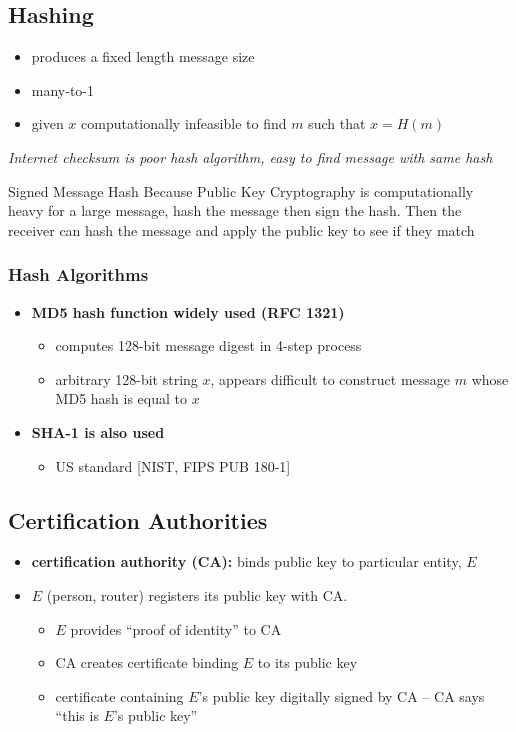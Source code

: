 \subsection{Hashing}
\begin{itemize}
	\item produces a fixed length message size
	\item many-to-1
	\item given $x$ computationally infeasible to find $m$ such that $x=H(m)$
\end{itemize}
\textit{Internet checksum is poor hash algorithm, easy to find message with same hash}
\begin{note}{Signed Message Hash}
	Because Public Key Cryptography is computationally heavy for a large message, hash the message then sign the hash. Then the receiver can hash the message and apply the public key to see if they match
\end{note}
\subsubsection{Hash Algorithms}
\begin{itemize}
	\item \textbf{MD5 hash function widely used (RFC 1321)}
	\begin{itemize}
		\item computes 128-bit message digest in 4-step process
		\item arbitrary 128-bit string $x$, appears difficult to construct message $m$ whose MD5 hash is equal to $x$
	\end{itemize}
	\item \textbf{SHA-1 is also used}
	\begin{itemize}
		\item US standard [NIST, FIPS PUB 180-1]
	\end{itemize}
\end{itemize}

\subsection{Certification Authorities}
\begin{itemize}
	\item \textbf{certification authority (CA):} binds public key to particular entity, $E$
	\item $E$ (person, router) registers its public key with CA.
	\begin{itemize}
		\item $E$ provides ``proof of identity'' to CA
		\item CA creates certificate binding $E$ to its public key
		\item certificate containing $E$'s public key digitally signed by CA -- CA says ``this is $E$'s public key''
	\end{itemize}
\end{itemize}


